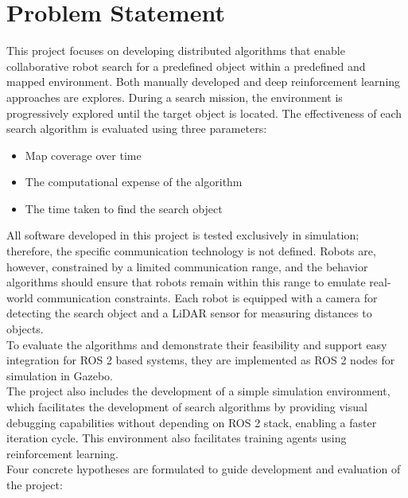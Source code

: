 \section{Problem Statement}
\label{sec:problem-statement}

This project focuses on developing distributed algorithms that enable collaborative robot search for a predefined object within a predefined and mapped environment. Both manually developed and deep reinforcement learning approaches are explores. During a search mission, the environment is progressively explored until the target object is located. The effectiveness of each search algorithm is evaluated using three parameters:

\begin{itemize}
    \item Map coverage over time
    \item The computational expense of the algorithm
    \item {\color{red} The time taken to find the search object}
\end{itemize}

All software developed in this project is tested exclusively in simulation; therefore, the specific communication technology is not defined. Robots are, however, constrained by a limited communication range, and the behavior algorithms should ensure that robots remain within this range to emulate real-world communication constraints. Each robot is equipped with a camera for detecting the search object and a LiDAR sensor for measuring distances to objects. \\

To evaluate the algorithms and demonstrate their feasibility and support easy integration for ROS 2 based systems, they are implemented as ROS 2 nodes for simulation in Gazebo. \\

The project also includes the development of a simple simulation environment, which facilitates the development of search algorithms by providing visual debugging capabilities without depending on ROS 2 stack, enabling a faster iteration cycle. This environment also facilitates training agents using reinforcement learning. \\

Four concrete hypotheses are formulated to guide development and evaluation of the project:


